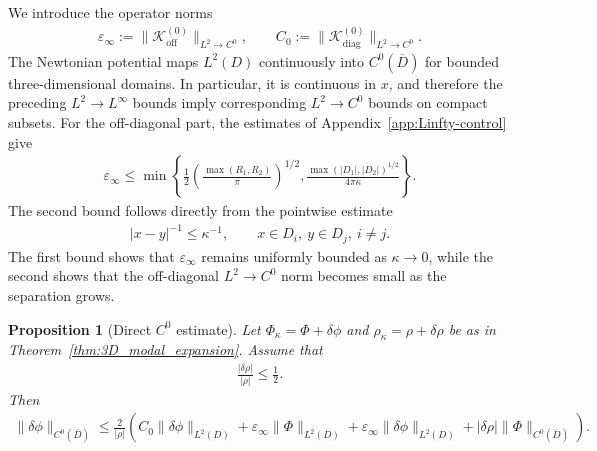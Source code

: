 \documentclass[10pt]{article}
\numberwithin{equation}{section}
\newtheorem{proposition}[theorem]{Proposition}
\begin{document}
We introduce the operator norms
\begin{align}
    \varepsilon_\infty
    :=
    \|\mathcal K_{\mathrm{off}}^{(0)}\|_{L^2\to C^0},
    \qquad
    C_0
    :=
    \|\mathcal K_{\mathrm{diag}}^{(0)}\|_{L^2\to C^0}.
    \label{eq:epsinf_C0_def}
\end{align}
The Newtonian potential maps $L^2(D)$ continuously into $C^0(\overline D)$ for bounded three-dimensional domains. %
In particular, it is continuous in \(x\), and therefore the preceding
\(L^2\to L^\infty\) bounds imply corresponding \(L^2\to C^0\) bounds on compact
subsets. For the off-diagonal part, the estimates of Appendix~\ref{app:Linfty-control}
give
\begin{align}
    \varepsilon_\infty
    \leq
    \min\left\{
    \frac12
    \left(\frac{\max(R_1,R_2)}{\pi}\right)^{1/2},
    \frac{\max(|D_1|,|D_2|)^{1/2}}{4\pi\kappa}
    \right\}.
    \label{eq:epsilon_infty_bound}
\end{align}
The second bound follows directly from the pointwise estimate
\begin{align*}
    |x-y|^{-1}\leq \kappa^{-1},
    \qquad x\in D_i,\ y\in D_j,\ i\neq j.
\end{align*}
The first bound shows that $\varepsilon_\infty$ remains uniformly bounded as
$\kappa\to0$, while the second shows that the off-diagonal $L^2\to C^0$
norm becomes small as the separation grows.

\begin{proposition}[Direct $C^0$ estimate]
\label{prop:directC0}
Let $\Phi_\kappa=\Phi+\delta\phi$ and $\rho_\kappa=\rho+\delta\rho$ be as in Theorem~\ref{thm:3D_modal_expansion}. Assume that
\begin{align}
    \frac{|\delta\rho|}{|\rho|}
    \leq
    \frac12.
    \label{eq:eigenvalue_shift_small}
\end{align}
Then
\begin{align}
    \|\delta\phi\|_{C^0(\overline D)}
    \leq
    \frac{2}{|\rho|}
    \left(
    C_0\|\delta\phi\|_{L^2(D)}
    +
    \varepsilon_\infty\|\Phi\|_{L^2(D)}
    +
    \varepsilon_\infty\|\delta\phi\|_{L^2(D)}
    +
    |\delta\rho|\|\Phi\|_{C^0(\overline D)}
    \right).
    \label{eq:direct_C0_estimate}
\end{align}
\end{proposition}
\end{document}
